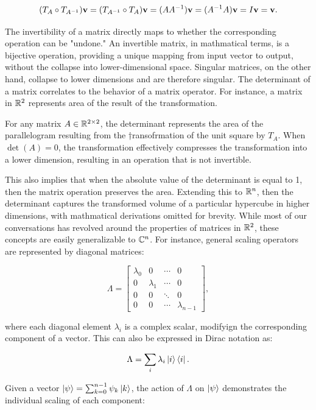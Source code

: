 \documentclass[12pt]{article}
\begin{document}
\[
(T_A \circ T_{A^{-1}})\mathbf{v} = (T_{A^{-1}} \circ T_A)\mathbf{v} = (A A^{-1})\mathbf{v} = (A^{-1} A)\mathbf{v} = I\mathbf{v} = \mathbf{v}.
\]

The invertibility of a matrix directly maps to whether the corresponding operation can be "undone." An invertible matrix, in mathmatical terms, is a bijective operation, providing a unique mapping from input vector to output, without the collapse into lower-dimensional space. Singular matrices, on the other hand, collapse to lower dimensions and are therefore singular. The determinant of a matrix correlates to the behavior of a matrix operator. For instance, a matrix in $\mathbb{R}^2$ represents area of the result of the transformation. 

\begin{theorem}
    For any matrix $A \in \mathbb{R}^{2 \times 2}$, the determinant represents the area of the parallelogram resulting from the †ransofrmation of the unit square by $T_A$. When $\det(A) = 0$, the transformation effectively compresses the transformation into a lower dimension, resulting in an operation that is not invertible. 
\end{theorem}

This also implies that when the absolute value of the determinant is equal to 1, then the matrix operation preserves the area. Extending this to $\mathbb{R}^n$, then the determinant captures the transformed volume of a particular hypercube in higher dimensions, with mathmatical derivations omitted for brevity. While most of our conversations has revolved around the properties of matrices in $\mathbb{R}^2$, these concepts are easily generalizable to $\mathbb{C}^n$. For instance, general scaling operators are represented by diagonal matrices:

\[
\Lambda = 
\begin{bmatrix}
\lambda_0 & 0 & \cdots & 0 \\
0 & \lambda_1 & \cdots & 0 \\
0 & 0 & \ddots & 0 \\
0 & 0 & \cdots & \lambda_{n-1}
\end{bmatrix},
\]

where each diagonal element $\lambda_i$ is a complex scalar, modifyign the corresponding component of a vector. This can also be expressed in Dirac notation as:

\[
\Lambda = \sum_{i} \lambda_i \ket{i} \bra{i}.
\]

Given a vector $\ket{\psi} = \sum_{k=0}^{n-1} \psi_k \ket{k}$, the action of $\Lambda$ on $\ket{\psi}$ demonstrates the individual scaling of each component:
\end{document}
